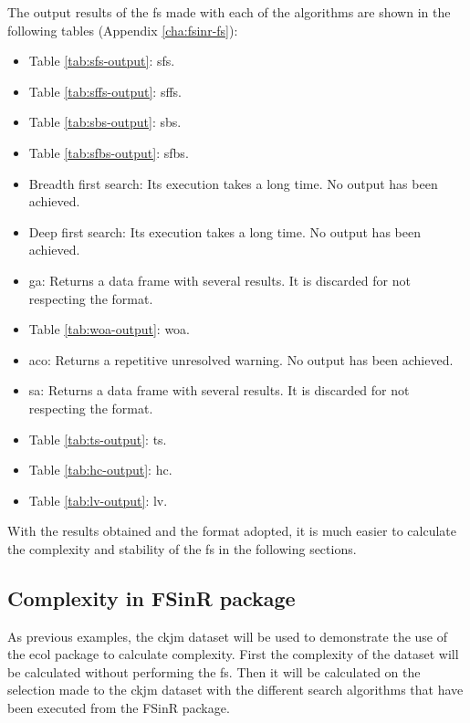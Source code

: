 The output results of the \acrshort{fs} made with each of the algorithms are shown in the following tables (Appendix \ref{cha:fsinr-fs}):

\begin{itemize}
    \item Table \ref{tab:sfs-output}: \acrlong{sfs}.
    \item Table \ref{tab:sffs-output}: \acrlong{sffs}.
    \item Table \ref{tab:sbs-output}: \acrlong{sbs}.
    \item Table \ref{tab:sfbs-output}: \acrlong{sfbs}.
    \item Breadth first search: Its execution takes a long time. No output has been achieved.
    \item Deep first search: Its execution takes a long time. No output has been achieved.
    \item \acrlong{ga}: Returns a data frame with several results. It is discarded for not respecting the format.
    \item Table \ref{tab:woa-output}: \acrlong{woa}.
    \item \acrlong{aco}: Returns a repetitive unresolved warning. No output has been achieved.
    \item \acrlong{sa}: Returns a data frame with several results. It is discarded for not respecting the format.
    \item Table \ref{tab:ts-output}: \acrlong{ts}.
    \item Table \ref{tab:hc-output}: \acrlong{hc}.
    \item Table \ref{tab:lv-output}: \acrlong{lv}.
\end{itemize}

With the results obtained and the format adopted, it is much easier to calculate the complexity and stability of the \acrshort{fs} in the following sections.

\subsection{Complexity in FSinR package}
\label{sec:complexity-fsinr}

As previous examples, the ckjm dataset will be used to demonstrate the use of the \acrshort{ecol} package to calculate complexity. First the complexity of the dataset will be calculated without performing the \acrshort{fs}. Then it will be calculated on the selection made to the ckjm dataset with the different search algorithms that have been executed from the FSinR package.

